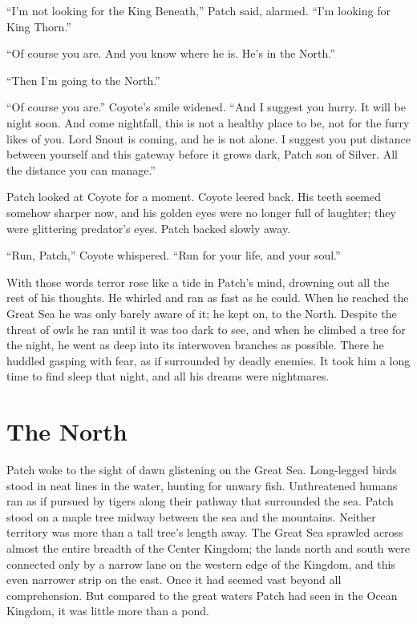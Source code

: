 \documentclass[ebook,oneside,openany,12pt]{memoir}
\begin{document}
“I’m not looking for the King Beneath,” Patch said, alarmed. “I’m
looking for King Thorn.”

“Of course you are. And you know where he is. He’s in the North.”

“Then I’m going to the North.”

“Of course you are.” Coyote’s smile widened. “And I suggest you
hurry. It will be night soon. And come nightfall, this is not a
healthy place to be, not for the furry likes of you. Lord Snout is
coming, and he is not alone. I suggest you put distance between
yourself and this gateway before it grows dark, Patch son of
Silver. All the distance you can manage.”

Patch looked at Coyote for a moment. Coyote leered back. His teeth
seemed somehow sharper now, and his golden eyes were no longer full of
laughter; they were glittering predator’s eyes. Patch backed slowly
away.

“Run, Patch,” Coyote whispered. “Run for your life, and your soul.”

With those words terror rose like a tide in Patch’s mind, drowning out
all the rest of his thoughts. He whirled and ran as fast as he
could. When he reached the Great Sea he was only barely aware of it;
he kept on, to the North. Despite the threat of owls he ran until it
was too dark to see, and when he climbed a tree for the night, he went
as deep into its interwoven branches as possible. There he huddled
gasping with fear, as if surrounded by deadly enemies. It took him a
long time to find sleep that night, and all his dreams were
nightmares.


\section{The North}

Patch woke to the sight of dawn glistening on the Great
Sea. Long-legged birds stood in neat lines in the water, hunting for
unwary fish. Unthreatened humans ran as if pursued by tigers along
their pathway that surrounded the sea. Patch stood on a maple tree
midway between the sea and the mountains. Neither territory was more
than a tall tree’s length away. The Great Sea sprawled across almost
the entire breadth of the Center Kingdom; the lands north and south
were connected only by a narrow lane on the western edge of the
Kingdom, and this even narrower strip on the east. Once it had seemed
vast beyond all comprehension. But compared to the great waters Patch
had seen in the Ocean Kingdom, it was little more than a pond.
\end{document}
